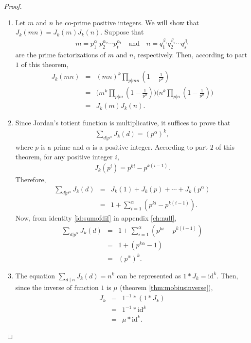 \documentclass[12pt]{subfile}
\begin{document}
\begin{proof}
\begin{enumerate}
				\item Let $m$ and $n$ be co-prime positive integers. We will show that $J_k(mn)=J_k(m)J_k(n)$. Suppose that
					\begin{align*}
						m = p_1^{\alpha_1}p_2^{\alpha_2} \cdots p_t^{\alpha_t} \quad \text{and} \quad n = q_1^{\beta_1}q_2^{\beta_2} \cdots q_s^{\beta_s}
					\end{align*}
				are the prime factorizations of  $m$ and $n$, respectively. Then, according to part $1$ of this theorem,
					\begin{eqnarray*}
						J_k(mn) &=& (mn)^{k} \prod\limits_{p|mn} \left(1 - \frac{1}{p^k}\right)\\
								&=& \Bigg(m^k \prod\limits_{p|m} \left(1 - \frac{1}{p^k}\right)\Bigg) \Bigg(n^k \prod\limits_{p|n} \left(1 - \frac{1}{p^k}\right)\Bigg) \\
								&=& J_k(m)J_k(n).
					\end{eqnarray*}

				\item Since Jordan's totient function is multiplicative, it suffices to prove that
					\begin{align*}
						\sum\limits_{d|p^\alpha} J_k(d) = (p^{\alpha})^k,
					\end{align*}
				where $p$ is a prime and $\alpha$ is a positive integer. According to part $2$ of this theorem, for any positive integer $i$,
					\begin{align*}
						J_k(p^i) = p^{ki} - p^{k (i -1)}.
					\end{align*}
				Therefore,
					\begin{eqnarray*}
						\sum_{d|p^\alpha} J_k(d) &=& J_k(1) + J_k(p) + \cdots + J_k(p^\alpha)\\
											 &=& 1 + \sum_{i = 1}^{\alpha} \left(p^{ki} - p^{k (i -1)}\right).
					\end{eqnarray*}
				Now, from identity \ref{id:sumofdif} in appendix \ref{ch:null},
					\begin{eqnarray*}
						\sum_{d|p^\alpha} J_k(d) &=& 1 + \sum_{i = 1}^{\alpha} \left(p^{ki} - p^{k (i -1)}\right)\\
											 &=& 1 + \left(p^{k \alpha}-1\right)\\
											 &=& (p^{\alpha})^k.
					\end{eqnarray*}

				\item The equation $\displaystyle \sum_{d\mid n} J_k(d) = n^k$ can be represented as $1 \ast J_k = \text{id}^k$. Then, since the inverse of function $1$ is $\mu$ (theorem \ref{thm:mobiusinverse}),
					\begin{eqnarray*}
						J_k &=& 1^{-1} \ast (1 \ast J_k)\\
							&=& 1^{-1} \ast \text{id}^k\\
							&=& \mu \ast \text{id}^k.
					\end{eqnarray*}


\end{enumerate}
\end{proof}
\end{document}
